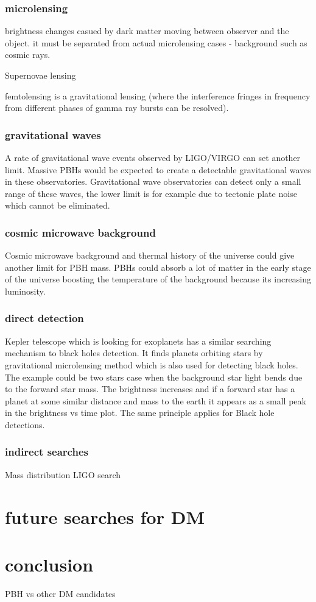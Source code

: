 \documentclass{article}
\begin{document}
\subsubsection {microlensing}
brightness changes casued by dark matter moving between observer and the object. \cite{GRIEST_1993_microlensing} 
it must be separated from actual microlensing cases - background such as cosmic rays. 

Supernovae lensing 

femtolensing is a gravitational lensing (where the interference fringes in frequency from different phases of gamma ray bursts can be resolved). \cite{Katz_2018}

\subsubsection {gravitational waves}
A rate of gravitational wave events observed by LIGO/VIRGO can set another limit. Massive PBHs would be expected to create a detectable gravitational waves in these observatories.  \cite{PBH_as_DM_candidate}
Gravitational wave observatories can detect only a small range of these waves, the lower limit is for example due to tectonic plate noise which cannot be eliminated. 




\subsubsection {cosmic microwave background}
Cosmic microwave background and thermal history of the universe could give another limit for PBH mass. PBHs could absorb a lot of matter in the early stage of the universe boosting the temperature of the background because its increasing luminosity.  \cite{PBH_as_DM_candidate}

\subsubsection{direct detection}
Kepler telescope which is looking for exoplanets has a similar searching mechanism to black holes detection. It finds planets orbiting stars by gravitational microlensing method which is also used for detecting black holes. The example could be two stars case when the background star light bends due to the forward star mass. The brightness increases and if a forward star has a planet at some similar distance and mass to the earth it appears as a small peak in the brightness vs time plot. The same principle applies for Black hole detections. 

\subsubsection {indirect searches}
Mass distribution LIGO search 

\section {future searches for DM}

\section {conclusion}
PBH vs other DM candidates 









\raggedright


\end{document}
